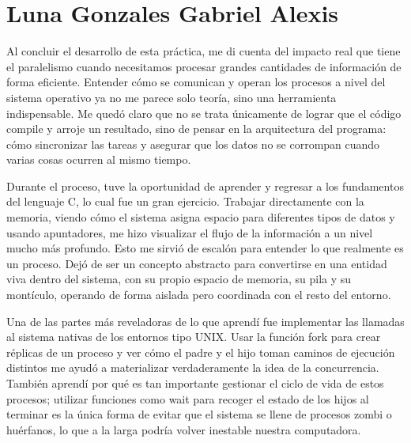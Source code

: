 \newpage
\section{Luna Gonzales Gabriel Alexis}


Al concluir el desarrollo de esta práctica, me di cuenta del impacto real que tiene el paralelismo cuando necesitamos procesar grandes cantidades de información de forma eficiente. Entender cómo se comunican y operan los procesos a nivel del sistema operativo ya no me parece solo teoría, sino una herramienta indispensable. Me quedó claro que no se trata únicamente de lograr que el código compile y arroje un resultado, sino de pensar en la arquitectura del programa: cómo sincronizar las tareas y asegurar que los datos no se corrompan cuando varias cosas ocurren al mismo tiempo. 

Durante el proceso, tuve la oportunidad de aprender y regresar a los fundamentos del lenguaje C, lo cual fue un gran ejercicio. Trabajar directamente con la memoria, viendo cómo el sistema asigna espacio para diferentes tipos de datos y usando apuntadores, me hizo visualizar el flujo de la información a un nivel mucho más profundo. Esto me sirvió de escalón para entender lo que realmente es un proceso. Dejó de ser un concepto abstracto para convertirse en una entidad viva dentro del sistema, con su propio espacio de memoria, su pila y su montículo, operando de forma aislada pero coordinada con el resto del entorno.

Una de las partes más reveladoras de lo que aprendí fue implementar las llamadas al sistema nativas de los entornos tipo UNIX. Usar la función fork para crear réplicas de un proceso y ver cómo el padre y el hijo toman caminos de ejecución distintos me ayudó a materializar verdaderamente la idea de la concurrencia. También aprendí por qué es tan importante gestionar el ciclo de vida de estos procesos; utilizar funciones como wait para recoger el estado de los hijos al terminar es la única forma de evitar que el sistema se llene de procesos zombi o huérfanos, lo que a la larga podría volver inestable nuestra computadora.

